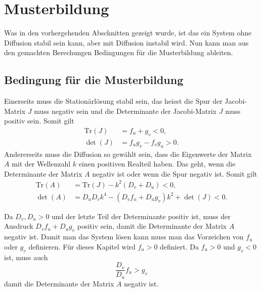 \section{Musterbildung
\label{reaktdiff:section:diffusioninduzierteInstabilitaet}}
Was in den vorhergehenden Abschnitten gezeigt wurde, ist das ein System ohne Diffusion stabil sein kann, aber mit Diffusion instabil wird.
Nun kann man aus den gemachten Berechungen Bedingungen für die Musterbildung ableiten.

\subsection{Bedingung für die Musterbildung}
Einerseits muss die Stationärlösung stabil sein, das heisst die Spur der Jacobi-Matrix \(J\) muss negativ sein und die Determinante der Jacobi-Matrix \(J\) muss positiv sein.
Somit gilt
\begin{align}
    \text{Tr}(J) &= f_u + g_v < 0, \label{reaktdiff:equation:reaktdiffbedingung1} \\
    \det(J) &= f_u g_v - f_v g_u > 0.\label{reaktdiff:equation:reaktdiffbedingung2}
\end{align}
Andererseits muss die Diffusion so gewählt sein, dass die Eigenwerte der Matrix \(A\) mit der Wellenzahl \(k\) einen positiven Realteil haben.
Das geht, wenn die Determinante der Matrix \(A\) negativ ist oder wenn die Spur negativ ist.
Somit gilt
\begin{align}
    \text{Tr}(A) &= \text{Tr}(J) - k^2(D_v + D_u)  < 0, \\
    \det(A) &= D_u D_v k^4 - (D_v f_u + D_u g_v)k^2 + \det(J) < 0.
    \label{reaktdiff:equation:reaktdiffbedingunen}
\end{align}

Da \(D_v,D_u > 0\) und der letzte Teil der Determinante positiv ist, muss der Ausdruck \(D_v f_u + D_u g_v\) positiv sein, damit die Determinante der Matrix \(A\) negativ ist.
Damit man das System lösen kann muss man das Vorzeichen von \(f_u\) oder \(g_v\) definieren.
Für dieses Kapitel wird \(f_u > 0\) definiert.
Da \(f_u > 0\) und \(g_v < 0\) ist, muss auch
\begin{equation}
    \frac{D_v}{D_u}f_u > g_v
\end{equation}
damit die Determinante der Matrix \(A\) negativ ist.

